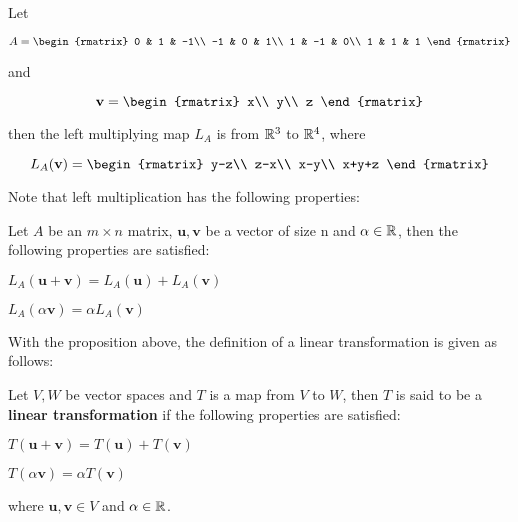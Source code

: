 \documentclass[a4paper,12pt]{article}
\begin{document}
\begin{exm}
  Let

  $$A=\begin{rmatrix}
    0 & 1 & -1\\
    -1 & 0 & 1\\
    1 & -1 & 0\\
    1 & 1 & 1
  \end{rmatrix}$$\s

  and

  $$\mathbf{v}=\begin{rmatrix}
    x\\
    y\\
    z
  \end{rmatrix}$$\s

  then the left multiplying map $L_{A}$ is from $\mathbb{R}^{3}$ to $\mathbb{R}^{4}$, where

  $$L_{A}(\mathbf{v})=\begin{rmatrix}
    y-z\\
    z-x\\
    x-y\\
    x+y+z
  \end{rmatrix}$$
\end{exm}\n

Note that left multiplication has the following properties:\n

\begin{pst}
  Let $A$ be an $m\times n$ matrix, $\mathbf{u},\mathbf{v}$ be a vector of size n and $\alpha\in\mathbb{R}$, then the following properties are satisfied:

  \begin{alist}
    \item $L_{A}(\mathbf{u}+\mathbf{v})=L_{A}(\mathbf{u})+L_{A}(\mathbf{v})$
    \item $L_{A}(\alpha\mathbf{v})=\alpha L_{A}(\mathbf{v})$
  \end{alist}
\end{pst}\n

With the proposition above, the definition of a linear transformation is given as follows:

\begin{dft}
  Let $V,W$ be vector spaces and $T$ is a map from $V$ to $W$, then $T$ is said to be a \textbf{linear transformation} if the following properties are satisfied:

  \begin{alist}
    \item $T(\mathbf{u}+\mathbf{v})=T(\mathbf{u})+T(\mathbf{v})$
    \item $T(\alpha\mathbf{v})=\alpha T(\mathbf{v})$
  \end{alist}

  where $\mathbf{u},\mathbf{v}\in V$ and $\alpha\in\mathbb{R}$.
\end{dft}
\end{document}
